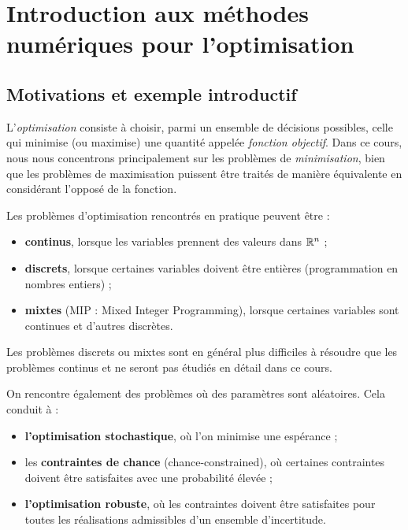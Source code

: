 \chapter{Introduction aux méthodes numériques pour l'optimisation}

\section{Motivations et exemple introductif}

L'\emph{optimisation} consiste à choisir, parmi un ensemble de décisions possibles,
celle qui minimise (ou maximise) une quantité appelée \emph{fonction objectif}.
Dans ce cours, nous nous concentrons principalement sur les problèmes de
\emph{minimisation}, bien que les problèmes de maximisation puissent être traités
de manière équivalente en considérant l'opposé de la fonction.

\medskip

Les problèmes d'optimisation rencontrés en pratique peuvent être :

\begin{itemize}
  \item \textbf{continus}, lorsque les variables prennent des valeurs dans $\mathbb{R}^n$ ;
  \item \textbf{discrets}, lorsque certaines variables doivent être entières
        (programmation en nombres entiers) ;
  \item \textbf{mixtes} (MIP : Mixed Integer Programming), lorsque certaines variables
        sont continues et d'autres discrètes.
\end{itemize}

Les problèmes discrets ou mixtes sont en général plus difficiles à résoudre que
les problèmes continus et ne seront pas étudiés en détail dans ce cours.

\medskip

On rencontre également des problèmes où des paramètres sont aléatoires. Cela conduit à :

\begin{itemize}
  \item \textbf{l’optimisation stochastique}, où l’on minimise une espérance ;
  \item les \textbf{contraintes de chance} (chance-constrained), où certaines contraintes doivent
        être satisfaites avec une probabilité élevée ;
  \item \textbf{l’optimisation robuste}, où les contraintes doivent être satisfaites pour toutes
        les réalisations admissibles d’un ensemble d’incertitude.
\end{itemize}

